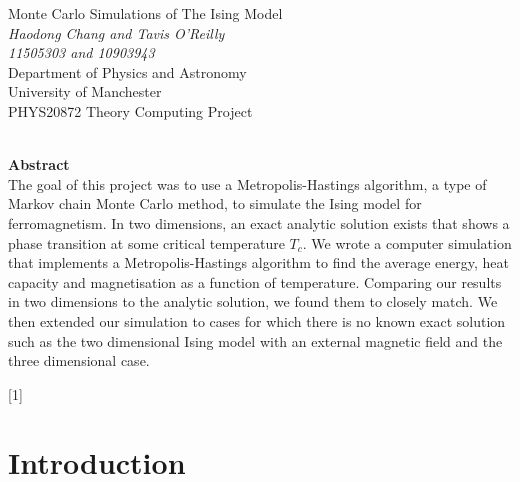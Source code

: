 \documentclass[11pt]{article}
\begin{document}
	
	\begin{titlepage}
		\begin{center}
			{\Huge Monte Carlo Simulations of The Ising Model}\\[0.5cm]
			\textit{Haodong Chang and Tavis O'Reilly}\\[0.3cm]
			\textit{11505303 and 10903943}\\[0.3cm]
			Department of Physics and Astronomy\\[0.3cm]
			University of Manchester\\[0.3cm]
			PHYS20872 Theory Computing Project\\[0.3cm]
			\shortmonthname[\the\month]  \the\year \\[4cm]
			
		\end{center}
		
		{\Large \textbf{Abstract}}\\[0.3cm]
		The goal of this project was to use a Metropolis-Hastings algorithm, a type of Markov chain Monte Carlo method, to simulate the Ising model for ferromagnetism. In two dimensions, an exact analytic solution exists\cite{onsager_solution} that shows a phase transition at some critical temperature $T_c$. We wrote a computer simulation that implements a Metropolis-Hastings algorithm to find the average energy, heat capacity and magnetisation as a function of temperature. Comparing our results in two dimensions to the analytic solution, we found them to closely match. We then extended our simulation to cases for which there is no known exact solution such as the two dimensional Ising model with an external magnetic field and the three dimensional case.
		
		\vfill
		[1] 
	\end{titlepage}
	
	\clearpage
	\setcounter{page}{2}
	
	\newpage
	
	\section{Introduction}
	
\end{document}

